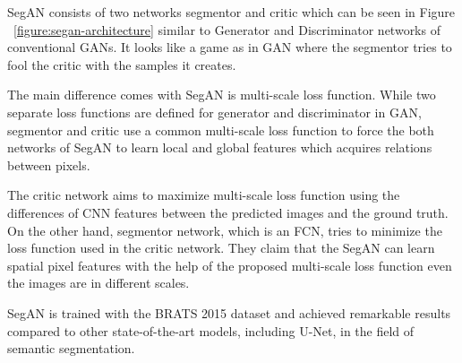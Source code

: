         SegAN consists of two networks segmentor and critic which can be seen in Figure ~\ref{figure:segan-architecture} similar to Generator and Discriminator networks of conventional GANs.
        It looks like a game as in GAN where the segmentor tries to fool the critic with the samples it creates.

        

        The main difference comes with SegAN is multi-scale loss function. While two separate loss functions are defined for generator and discriminator in GAN,
        segmentor and critic use a common multi-scale loss function to force the both networks of SegAN to learn local and global features which acquires relations between pixels.

        The critic network aims to maximize multi-scale loss function using the differences of CNN features between the predicted images and the ground truth.
        On the other hand, segmentor network, which is an FCN, tries to minimize the loss function used in the critic network.
        They claim that the SegAN can learn spatial pixel features with the help of the proposed multi-scale loss function even the images are in different scales.

        SegAN is trained with the BRATS 2015 dataset and achieved remarkable results compared to other state-of-the-art models, including U-Net, in the field of semantic segmentation.
